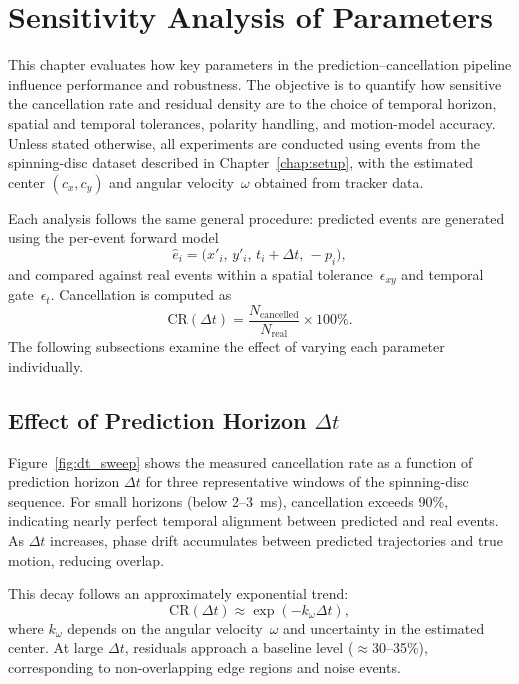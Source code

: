 \chapter{Sensitivity Analysis of Parameters}
\label{chap:metrics}

This chapter evaluates how key parameters in the prediction–cancellation pipeline influence performance and robustness. 
The objective is to quantify how sensitive the cancellation rate and residual density are to the choice of temporal horizon, spatial and temporal tolerances, polarity handling, and motion-model accuracy.
Unless stated otherwise, all experiments are conducted using events from the spinning-disc dataset described in Chapter~\ref{chap:setup}, with the estimated center \((c_x, c_y)\) and angular velocity~\(\omega\) obtained from tracker data.

Each analysis follows the same general procedure: predicted events are generated using the per-event forward model
\[
\hat{e}_i = \big(x'_i,\, y'_i,\, t_i + \Delta t,\, -p_i \big),
\]
and compared against real events within a spatial tolerance~\(\epsilon_{xy}\) and temporal gate~\(\epsilon_t\). 
Cancellation is computed as
\[
\text{CR}(\Delta t) = \frac{N_{\text{cancelled}}}{N_{\text{real}}} \times 100\%.
\]
The following subsections examine the effect of varying each parameter individually.

\section{Effect of Prediction Horizon \(\Delta t\)}
\label{sec:dt_sensitivity}

Figure~\ref{fig:dt_sweep} shows the measured cancellation rate as a function of prediction horizon \(\Delta t\) for three representative windows of the spinning-disc sequence. 
For small horizons (below 2–3~ms), cancellation exceeds 90\%, indicating nearly perfect temporal alignment between predicted and real events.
As \(\Delta t\) increases, phase drift accumulates between predicted trajectories and true motion, reducing overlap.

This decay follows an approximately exponential trend:
\[
\text{CR}(\Delta t) \approx \exp\!\left(-k_{\omega}\Delta t\right),
\]
where \(k_{\omega}\) depends on the angular velocity~\(\omega\) and uncertainty in the estimated center.
At large \(\Delta t\), residuals approach a baseline level (\(\approx\)30–35\%), corresponding to non-overlapping edge regions and noise events.


